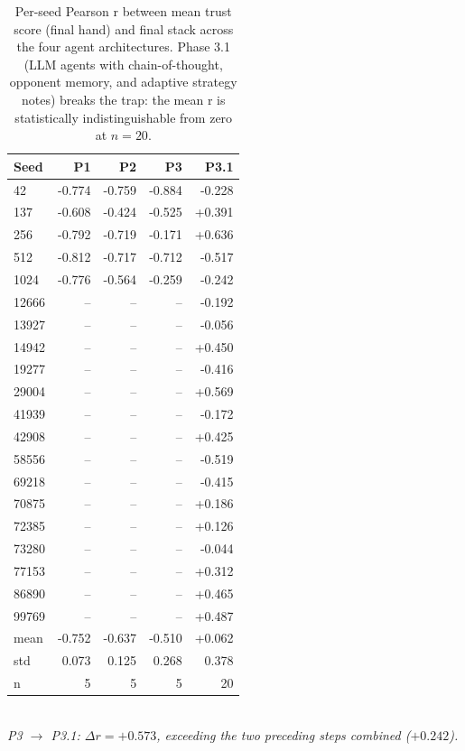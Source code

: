 \begin{table}[ht]
\centering
\small
\begin{tabular}{lrrrr}
\hline
Seed & P1 & P2 & P3 & P3.1 \\
\hline
42 & -0.774 & -0.759 & -0.884 & -0.228 \\
137 & -0.608 & -0.424 & -0.525 & +0.391 \\
256 & -0.792 & -0.719 & -0.171 & +0.636 \\
512 & -0.812 & -0.717 & -0.712 & -0.517 \\
1024 & -0.776 & -0.564 & -0.259 & -0.242 \\
12666 & -- & -- & -- & -0.192 \\
13927 & -- & -- & -- & -0.056 \\
14942 & -- & -- & -- & +0.450 \\
19277 & -- & -- & -- & -0.416 \\
29004 & -- & -- & -- & +0.569 \\
41939 & -- & -- & -- & -0.172 \\
42908 & -- & -- & -- & +0.425 \\
58556 & -- & -- & -- & -0.519 \\
69218 & -- & -- & -- & -0.415 \\
70875 & -- & -- & -- & +0.186 \\
72385 & -- & -- & -- & +0.126 \\
73280 & -- & -- & -- & -0.044 \\
77153 & -- & -- & -- & +0.312 \\
86890 & -- & -- & -- & +0.465 \\
99769 & -- & -- & -- & +0.487 \\
mean & -0.752 & -0.637 & -0.510 & +0.062 \\
std & 0.073 & 0.125 & 0.268 & 0.378 \\
n & 5 & 5 & 5 & 20 \\
\hline
\end{tabular}
\\[2pt]\footnotesize\emph{P3 $\to$ P3.1: $\Delta r = +0.573$, exceeding the two preceding steps combined ($ +0.242$).}
\caption{Per-seed Pearson r between mean trust score (final hand) and final stack across the four agent architectures. Phase 3.1 (LLM agents with chain-of-thought, opponent memory, and adaptive strategy notes) breaks the trap: the mean r is statistically indistinguishable from zero at $n=20$.}
\label{tab:ladder}
\end{table}
